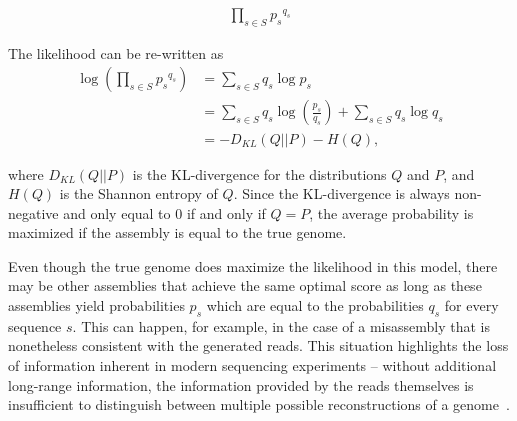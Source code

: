 \documentclass[12pt,\mydriver]{thesis}
\begin{document}

\begin{align*}
\prod_{s \in S} {p_s}^{q_s}
\end{align*}






The likelihood can be re-written as
\begin{align*}
\log (\prod_{s \in S} {p_s}^{q_s}) & = \sum_{s \in S} q_s \log p_s \\
& = \sum_{s \in S} q_s \log (\frac{p_s}{q_s}) + \sum_{s \in S} q_s \log q_s \\
& = - D_{KL}(Q||P) - H(Q),
\end{align*}


\noindent where $D_{KL}(Q||P)$ is the KL-divergence for the distributions $Q$ and
$P$, and $H(Q)$ is the Shannon entropy of $Q$.  Since the
KL-divergence is always non-negative and only equal to 0 if and only if $Q = P$,
the average probability is maximized if the assembly is equal to the
true genome.

Even though the true genome does maximize the likelihood in this
model, there may be other assemblies that achieve the same optimal
score as long as these assemblies yield probabilities $p_s$ which are
equal to the probabilities $q_s$ for every sequence $s$.  This can happen, for example,
in the case of a misassembly that is nonetheless consistent with the
generated reads.  This situation highlights the loss of information
inherent in modern sequencing experiments -- without additional
long-range information, the information provided by the reads
themselves is insufficient to distinguish between multiple possible
reconstructions of a genome~\cite{kingsford2010assembly}.
\end{document}
